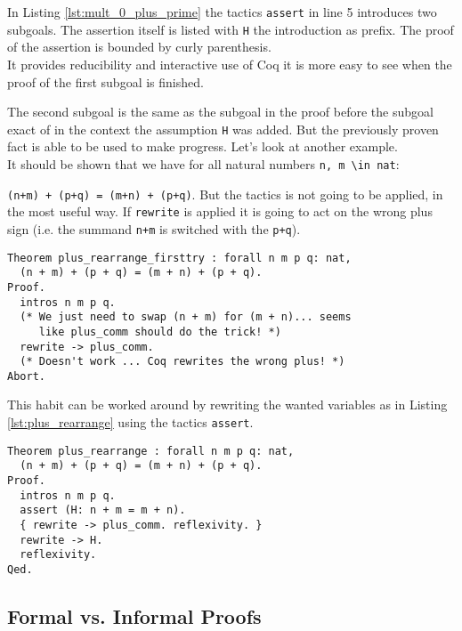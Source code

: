 In Listing \ref{lst:mult_0_plus_prime} the tactics \lstinline!assert! in line 5 introduces two subgoals. 
The assertion itself is listed with \lstinline!H! the introduction as prefix.
The proof of the assertion is bounded by curly parenthesis.\\
It provides reducibility and interactive use of Coq it is more easy to see when the proof of the first subgoal is finished.

The second subgoal is the same as the subgoal in the proof before the subgoal exact of in the context the assumption \lstinline!H! was added.
But the previously proven fact is able to be used to make progress.
Let's look at another example.\\
 
It should be shown that we have for all natural numbers \lstinline!n, m \in nat!:
 
\lstinline!(n+m) + (p+q) = (m+n) + (p+q)!.
But the tactics is not going to be applied, in the most useful way. 
If \lstinline!rewrite! is applied it is going to act on the wrong plus sign (i.e. the summand \lstinline!n+m! is switched with the \lstinline!p+q!).
\begin{lstlisting}[caption = \lstinline!plus_rearrange_firstttry!, label=lst:plus_rearrange_firsttry]
Theorem plus_rearrange_firsttry : forall n m p q: nat,
  (n + m) + (p + q) = (m + n) + (p + q).
Proof.
  intros n m p q.
  (* We just need to swap (n + m) for (m + n)... seems
     like plus_comm should do the trick! *)
  rewrite -> plus_comm.
  (* Doesn't work ... Coq rewrites the wrong plus! *)
Abort.
\end{lstlisting}

This habit can be worked around by rewriting the wanted variables as in Listing \ref{lst:plus_rearrange} using the tactics \lstinline!assert!. 

\begin{lstlisting}[caption = \lstinline!plus_rearrange!, label = lst:plus_rearrange]
Theorem plus_rearrange : forall n m p q: nat,
  (n + m) + (p + q) = (m + n) + (p + q).
Proof.
  intros n m p q.
  assert (H: n + m = m + n).
  { rewrite -> plus_comm. reflexivity. }
  rewrite -> H. 
  reflexivity.  
Qed.
\end{lstlisting}


\subsection{Formal vs. Informal Proofs}

